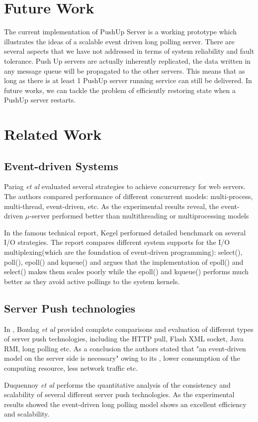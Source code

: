 \section{Future Work}

The current implementation of PushUp Server is a working prototype which illustrates
the ideas of a scalable event driven long polling server. There are several aspects that
we have not addressed in terms of system reliability and fault tolerance. Push Up servers
are actually inherently replicated, the data written in any message queue will be propagated
to the other servers. This means that as long as there is at least 1 PushUp server running
service can still be delivered. In future works, we can tackle the problem of efficiently
restoring state when a PushUp server restarts.

\section{Related Work\\}

\subsection{Event-driven Systems\\}

Pariag \emph{et al} \cite{David} evaluated several strategies to achieve concurrency
for web servers. The authors compared performance of different concurrent models:
multi-process, multi-thread, event-driven, etc.  As the experimental 
results reveal, the event-driven $\mu$-server performed better than 
multithreading or multiprocessing models
    
In the famous technical report\cite{C10K}, Kegel performed detailed
benchmark on several I/O strategies. The report compares different 
system supports for the I/O multiplexing(which are the foundation
of event-driven programming): select(), poll(), epoll() and kqueue() 
and argues that the implementation of epoll() and select() makes them
scales poorly while the epoll() and kqueue() performs much better as
they avoid active pollings to the system kernels.

\subsection{Server Push technologies\\}

In \cite{Engin}, Bozdag \emph{et al} provided complete comparisons 
and evaluation of different types of server push technologies, including the 
HTTP pull, Flash XML socket, Java RMI, long polling etc. As a conclusion the
authors stated that "an event-driven model on the server side is necessary" 
owing to its , lower consumption of the computing resource, less network
traffic etc.

Duquennoy \emph{et al} \cite{duquennoy09consistency} performs the quantitative 
analysis of the consistency and scalability of several different server
push technologies. As the experimental results showed the event-driven
long polling model shows an excellent efficiency and scalability.

